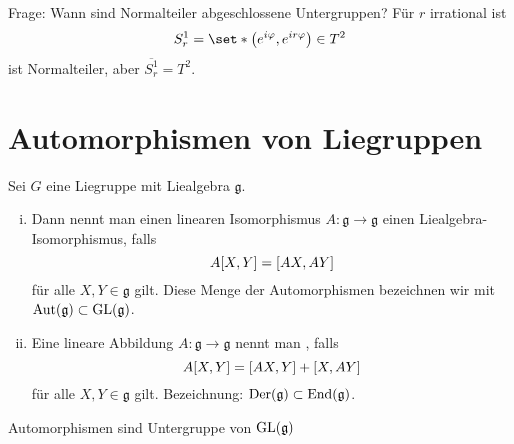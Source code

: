 Frage: Wann sind Normalteiler abgeschlossene Untergruppen?
Für $r$ irrational ist
\[
	S^1_r = \set*{\enbrace*{e^{i \varphi}, e^{i r \varphi}} \in T^2}
\]
ist Normalteiler, aber $\overline{S^1_r}=T^2$.

\section{Automorphismen von Liegruppen} %
\label{sec:16}

\begin{definition}
	Sei $G$ eine Liegruppe mit Liealgebra $\mathfrak{g}$.
	\begin{enumerate}[(i)]
		\item Dann nennt man einen linearen Isomorphismus $A \colon \mathfrak{g} \to \mathfrak{g}$ einen Liealgebra-Isomorphismus, falls 
	\[
		A \benbrace*{X,Y} = \benbrace*{AX,AY}
	\]
	für alle $X,Y \in \mathfrak{g}$ gilt.
	Diese Menge der Automorphismen bezeichnen wir mit $\operatorname{Aut}(\mathfrak{g}) \subset \operatorname{GL}(\mathfrak{g})$.
	\item Eine lineare Abbildung $A \colon \mathfrak{g} \to \mathfrak{g}$ nennt man , falls 
	\[
		A \benbrace*{X,Y} = \benbrace*{AX,Y} + \benbrace*{X,AY}
	\] 
	für alle $X,Y \in \mathfrak{g}$ gilt. Bezeichnung: $\operatorname{Der}(\mathfrak{g}) \subset \operatorname{End}(\mathfrak{g})$.
	\end{enumerate}	
	Automorphismen sind Untergruppe von $\operatorname{GL}(\mathfrak{g})$
\end{definition}

